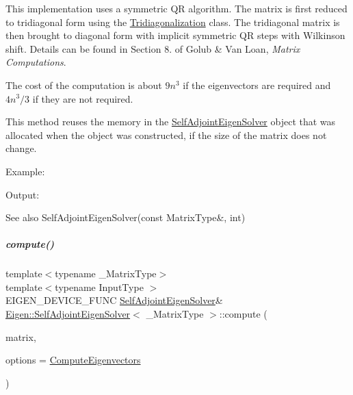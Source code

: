 This implementation uses a symmetric QR algorithm. The matrix is first reduced to tridiagonal form using the \hyperlink{group___eigenvalues___module_class_eigen_1_1_tridiagonalization}{Tridiagonalization} class. The tridiagonal matrix is then brought to diagonal form with implicit symmetric QR steps with Wilkinson shift. Details can be found in Section 8. of Golub \& Van Loan, {\itshape Matrix Computations}.

The cost of the computation is about $ 9n^3 $ if the eigenvectors are required and $ 4n^3/3 $ if they are not required.

This method reuses the memory in the \hyperlink{group___eigenvalues___module_class_eigen_1_1_self_adjoint_eigen_solver}{Self\+Adjoint\+Eigen\+Solver} object that was allocated when the object was constructed, if the size of the matrix does not change.

Example\+: 
\begin{DoxyCodeInclude}
\end{DoxyCodeInclude}
 Output\+: 
\begin{DoxyVerbInclude}
\end{DoxyVerbInclude}


\begin{DoxySeeAlso}{See also}
Self\+Adjoint\+Eigen\+Solver(const Matrix\+Type\&, int) 
\end{DoxySeeAlso}
\mbox{\label{group___eigenvalues___module_a88bcdc24112efa7c4d2ebb3476efcbe9}} 
\subparagraph{\texorpdfstring{compute()}{compute()}\hspace{0.1cm}{\footnotesize\ttfamily [2/2]}}
{\footnotesize\ttfamily template$<$typename \+\_\+\+Matrix\+Type$>$ \\
template$<$typename Input\+Type $>$ \\
E\+I\+G\+E\+N\+\_\+\+D\+E\+V\+I\+C\+E\+\_\+\+F\+U\+NC \hyperlink{group___eigenvalues___module_class_eigen_1_1_self_adjoint_eigen_solver}{Self\+Adjoint\+Eigen\+Solver}\& \hyperlink{group___eigenvalues___module_class_eigen_1_1_self_adjoint_eigen_solver}{Eigen\+::\+Self\+Adjoint\+Eigen\+Solver}$<$ \+\_\+\+Matrix\+Type $>$\+::compute (\begin{DoxyParamCaption}\item[{const \hyperlink{group___core___module_struct_eigen_1_1_eigen_base}{Eigen\+Base}$<$ Input\+Type $>$ \&}]{matrix,  }\item[{int}]{options = {\ttfamily \hyperlink{group__enums_ggae3e239fb70022eb8747994cf5d68b4a9ada93d8885bde32b876ba4af01d3292cc}{Compute\+Eigenvectors}} }\end{DoxyParamCaption})}



